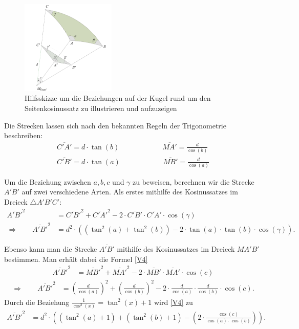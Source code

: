 \begin{refsection}
\begin{figure}[htbp]
\centering
\includegraphics[width=0.4\textwidth]{kugel/Seitenkosinus.jpg}
\caption{Hilfsskizze um die Beziehungen auf der Kugel rund um den
Seitenkosinussatz zu illustrieren und aufzuzeigen}
\end{figure}

Die Strecken lassen sich nach den bekannten Regeln der Trigonometrie
beschreiben:
\begin{align*}
\overline{C'A'} = d\cdot {\tan(b)} \quad \quad \quad \quad \quad \quad 
\overline{MA'} = \frac{ d }{\cos(b)} \\
\overline{C'B'} = d\cdot {\tan(a)} \quad \quad \quad \quad \quad \quad 
\overline{MB'} = \frac{ d }{\cos(a)}
\end{align*} 

Um die Beziehung zwischen $a,b,c$ und $\gamma$ zu beweisen, berechnen
wir die Strecke $\overline{A'B'}$ auf zwei verschiedene Arten.
Als erstes mithilfe des Kosinussatzes im Dreieck $\triangle{A'B'C'}$:
\begin{align}
\overline{A'B'}^{ 2 } &= \overline{ C'B' }^{ 2 } + \overline{ C'A' }^{ 2 } - 2 \cdot \overline{C'B'} \cdot \overline{ C'A' } \cdot \cos(\gamma) \nonumber \\ 
\Rightarrow \quad \quad
\overline{A'B'}^{ 2 } &= d^{ 2 } \cdot \left(\left(\tan^{ 2 }(a) + \tan^{ 2 }(b)\right) - 2\cdot \tan(a) \cdot \tan(b) \cdot \cos(\gamma)\right).
\label {V3} 
\end{align}

Ebenso kann man die Strecke $\overline{A'B'}$ mithilfe des Kosinussatzes
im Dreieck $MA'B'$ bestimmen. Man erhält dabei die Formel \eqref{V4}
\begin{align*}
\overline{A'B'}^{2} &= \overline{MB'}^{2} + \overline{MA'}^{2} - 2\cdot \overline{MB'} \cdot \overline{MA'} \cdot \cos(c)
\end{align*}
\begin{align}
\Rightarrow \quad \quad
\overline{A'B'}^{ 2 } &= \left(\frac{ d }{\cos(a) }  \right)^{ 2 } + \left(\frac{ d }{\cos(b)}  \right)^{ 2 } - 2 \cdot \frac{ d }{\cos(a)} \cdot \frac{ d }{\cos(b)} \cdot \cos(c).
\label{V4}
\end{align}
Durch die Beziehung $\frac{1}{\cos^{2}(x)}=\tan^{2}(x)+1$ wird \eqref{V4} zu 
\begin{align}
\overline{ A'B'}^{ 2 } &= d^{ 2 } \cdot \left(\left(\tan^{ 2 }(a) + 1\right) + \left(\tan^{ 2 }(b) + 1\right) - \left(2 \cdot \frac{\cos(c)}{\cos(a) \cdot \cos(b)}\right)\right).
\label {V6}
\end{align}


\end{refsection}
